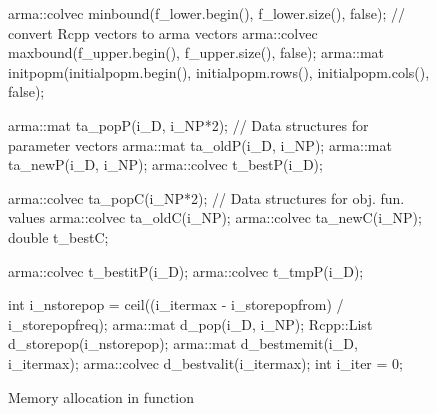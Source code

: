 \documentclass[nojss,shortnames,article]{jss}
\begin{document}
\begin{sidewaysfigure}
\begin{minipage}{0.56\linewidth}
    \begin{CodeChunk}
      \begin{CodeInput}
        arma::colvec minbound(f_lower.begin(), f_lower.size(), false);  // convert Rcpp vectors to arma vectors
        arma::colvec maxbound(f_upper.begin(), f_upper.size(), false);
        arma::mat initpopm(initialpopm.begin(), initialpopm.rows(), initialpopm.cols(), false);

        arma::mat ta_popP(i_D, i_NP*2);                                 // Data structures for parameter vectors 
        arma::mat ta_oldP(i_D, i_NP);
        arma::mat ta_newP(i_D, i_NP);
        arma::colvec t_bestP(i_D); 

        arma::colvec ta_popC(i_NP*2);                                   // Data structures for obj. fun. values 
        arma::colvec ta_oldC(i_NP);
        arma::colvec ta_newC(i_NP);
        double t_bestC; 

        arma::colvec t_bestitP(i_D);
        arma::colvec t_tmpP(i_D); 

        int i_nstorepop = ceil((i_itermax - i_storepopfrom) / i_storepopfreq);
        arma::mat d_pop(i_D, i_NP); 
        Rcpp::List d_storepop(i_nstorepop);
        arma::mat d_bestmemit(i_D, i_itermax);       
        arma::colvec d_bestvalit(i_itermax);     
        int i_iter = 0;
      \end{CodeInput}
    \end{CodeChunk}

    \normalsize
  \end{minipage}
  \caption{Memory allocation in   function}
  \label{fig:deoptim_memory}
\end{sidewaysfigure}
\end{document}
